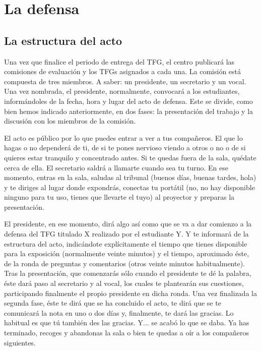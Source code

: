\chapter{La defensa}
\label{cap:Defensa}

\section{La estructura del acto}

Una vez que finalice el periodo de entrega del TFG, el centro publicará las comisiones de evaluación y los TFGs asignados a cada una. La comisión está compuesta de tres miembros. A saber: un presidente, un secretario y un vocal. Una vez nombrada, el presidente, normalmente, convocará a los estudiantes, informándoles de la fecha, hora y lugar del acto de defensa. Este se divide, como bien hemos indicado anteriormente, en dos fases: la presentación del trabajo y la discusión con los miembros de la comisión.

El acto es público por lo que puedes entrar a ver a tus compañeros. El que lo hagas o no dependerá de ti, de si te pones nervioso viendo a otros o no o de si quieres estar tranquilo y concentrado antes. Si te quedas fuera de la sala, quédate cerca de ella. El secretario saldrá a llamarte cuando sea tu turno. En ese momento, entras en la sala, saludas al tribunal (buenos días, buenas tardes, hola) y te diriges al lugar donde expondrás, conectas tu portátil (no, no hay disponible ninguno para tu uso, tienes que llevarte el tuyo) al proyector y preparas la presentación. 

El presidente, en ese momento, dirá algo así como que se va a dar comienzo a la defensa del TFG titulado X realizado por el estudiante Y. Y te informará de la estructura del acto, indicándote explícitamente el tiempo que tienes disponible para la exposición (normalmente veinte minutos) y el tiempo, aproximado éste, de la ronda de preguntas y comentarios (otros veinte minutos habitualmente). Tras la presentación, que comenzarás sólo cuando el presidente te dé la palabra, éste dará paso al secretario y al vocal, los cuales te plantearán sus cuestiones, participando finalmente el propio presidente en dicha ronda. Una vez finalizada la segunda fase, éste te dirá que se ha concluido el acto, te dirá que se te comunicará la nota en uno o dos días y, finalmente, te dará las gracias. Lo habitual es que tú también des las gracias. Y... se acabó lo que se daba. Ya has terminado, recoges y abandonas la sala o bien te quedas a oír a los compañeros siguientes.

